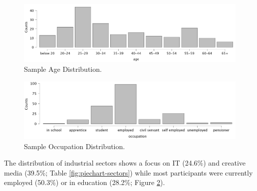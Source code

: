 \documentclass[
  a4paper,  %
  twoside,  %
  bibliography=totoc,
  headsepline,
  cleardoublepage=empty,
  parskip=half,
  draft=false
]{scrbook}
\begin{document}
\begin{figure}[h]
  \centering
  \includegraphics[width=1\textwidth]{graphics/statistics/age-plot.png}
  \caption{Sample Age Distribution.}
  \label{fig:age-distribution}
\end{figure}
\begin{figure}[h]
  \centering
  \includegraphics[width=1\textwidth]{graphics/statistics/occupation.png}
  \caption{Sample Occupation Distribution.}
  \label{fig:occupation-plot}
\end{figure}

The distribution of industrial sectors shows a focus on IT (24.6\%) and creative media (39.5\%; Table \ref{fig:piechart-sectors}) while most participants were currently employed (50.3\%) or in education (28.2\%; Figure \ref{fig:occupation-plot}). 
\end{document}
